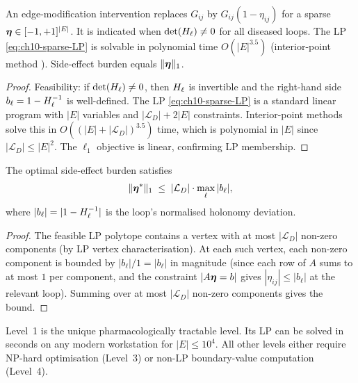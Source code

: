 \begin{proposition}
\label{prop:level1}
An edge-modification intervention replaces $G_{ij}$ by $G_{ij}(1-\eta_{ij})$
for a sparse $\boldsymbol{\eta} \in [-1,+1]^{|E|}$.  It is indicated when
$\det(H_\ell) \neq 0$ for all diseased loops.  The LP \eqref{eq:ch10-sparse-LP}
is solvable in polynomial time $O(|E|^{3.5})$ (interior-point method
\citep{Dantzig1963}).  Side-effect burden equals $\|\boldsymbol{\eta}\|_1$.
\end{proposition}

\begin{proof}
Feasibility: if $\det(H_\ell) \neq 0$, then $H_\ell$ is invertible and the
right-hand side $b_\ell = 1 - H_\ell^{-1}$ is well-defined.  The LP
\eqref{eq:ch10-sparse-LP} is a standard linear program with $|E|$ variables
and $|\mathcal{L}_D| + 2|E|$ constraints.  Interior-point methods solve
this in $O((|E| + |\mathcal{L}_D|)^{3.5})$ time, which is polynomial in
$|E|$ since $|\mathcal{L}_D| \leq |E|^2$.  The $\ell_1$ objective is linear,
confirming LP membership.
\end{proof}

\begin{proposition}
\label{prop:ch10-l1-sideeffect}
The optimal side-effect burden satisfies
\[
  \|\boldsymbol{\eta}^*\|_1 \;\leq\; |\mathcal{L}_D| \cdot \max_\ell |b_\ell|,
\]
where $|b_\ell| = |1 - H_\ell^{-1}|$ is the loop's normalised holonomy
deviation.
\end{proposition}

\begin{proof}
The feasible LP polytope contains a vertex with at most $|\mathcal{L}_D|$
non-zero components (by LP vertex characterisation).  At each such vertex,
each non-zero component is bounded by $|b_\ell|/1 = |b_\ell|$ in magnitude
(since each row of $A$ sums to at most $1$ per component, and the constraint
$|A\boldsymbol{\eta} = b|$ gives $|\eta_{ij}| \leq |b_\ell|$ at the relevant loop).
Summing over at most $|\mathcal{L}_D|$ non-zero components gives the bound.
\end{proof}

\begin{remark}
\label{rem:level1-complexity}
Level~1 is the unique pharmacologically tractable level.  Its LP can be solved
in seconds on any modern workstation for $|E| \leq 10^4$.  All other levels
either require NP-hard optimisation (Level~3) or non-LP boundary-value
computation (Level~4).
\end{remark}

